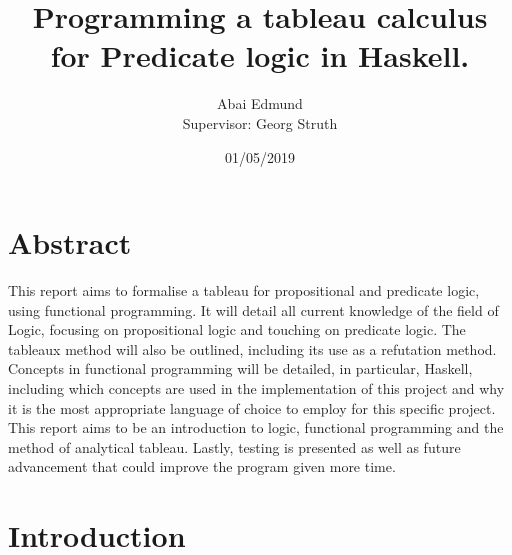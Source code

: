 \documentclass{article}%
\title{Programming a tableau calculus for Predicate logic in Haskell.}
\date{01/05/2019\\}
\author{Abai Edmund\\  Supervisor: Georg Struth}
\begin{document}
\maketitle
\newpage
\section{Abstract} 
This report aims to formalise a tableau for propositional and predicate logic, using functional programming. It will detail all current knowledge of the field of Logic, focusing on propositional logic and touching on predicate logic. The tableaux method will also be outlined, including its use as a refutation method. Concepts in functional programming will be detailed, in particular, Haskell, including which concepts are used in the implementation of this project and why it is the most appropriate language of choice to employ for this specific project. This report aims to be an introduction to logic, functional programming and the method of analytical tableau. Lastly, testing is presented as well as future advancement that could improve the program given more time.
\newpage
\tableofcontents
\newpage
\section{Introduction}
\end{document}
